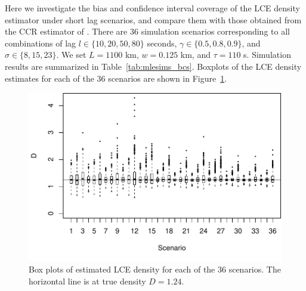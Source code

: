 \documentclass[useAMS, usenatbib, referee]{biom}\usepackage[]{graphicx}\usepackage[]{color}
\makeatletter
\def\maxwidth{ %
  \ifdim\Gin@nat@width>\linewidth
    \linewidth
  \else
    \Gin@nat@width
  \fi
}
\newenvironment{knitrout}{}{} %
\makeatother
\begin{document}
Here we investigate the bias and confidence interval coverage of the LCE density estimator under short lag scenarios, and compare them with those obtained from the CCR estimator of \cite{Stevenson+al:19}. There are 36 simulation scenarios corresponding to all combinations of lag $l \in \{ 10, 20, 50, 80\}$ seconds,  $\gamma \in\{ 0.5, 0.8, 0.9 \}$, and $\sigma\in\{ 8, 15, 23\}$. We set $L = 1100$ km, $w = 0.125$ km, and $\tau = 110$ s. Simulation results are summarized in Table~\ref{tab:mlesims_bcs}. Boxplots of the LCE density estimates for each of the 36 scenarios are shown in Figure~\ref{fig:fig_boxplots_bcs}.


\begin{knitrout}
\color{fgcolor}\begin{figure}

{\centering \includegraphics[width=\maxwidth]{figs/fig_boxplots_bcs-1} 

}

\caption[Box plots of estimated LCE density for each of the 36 scenarios]{Box plots of estimated LCE density for each of the 36 scenarios. The horizontal line is at true density \(D=1.24\). }\label{fig:fig_boxplots_bcs}
\end{figure}


\end{knitrout}
\end{document}

